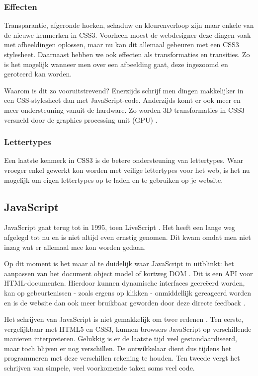 \subsubsection{Effecten}
Transparantie, afgeronde hoeken, schaduw en kleurenverloop zijn maar enkele van de nieuwe kenmerken in CSS3. Voorheen moest de webdesigner deze dingen vaak met afbeeldingen oplossen, maar nu kan dit allemaal gebeuren met een CSS3 stylesheet. Daarnaast hebben we ook effecten als transformaties en transities. Zo is het mogelijk wanneer men over een afbeelding gaat, deze ingezoomd en geroteerd kan worden. 

Waarom is dit zo vooruitstrevend? Enerzijds schrijf men dingen makkelijker in een CSS-stylesheet dan met JavaScript-code. Anderzijds komt er ook meer en meer ondersteuning vanuit de hardware. Zo worden 3D transformaties in CSS3 versneld door de graphics processing unit (GPU) \cite{Hales2012}.

\subsubsection{Lettertypes}
Een laatste kenmerk in CSS3 is de betere ondersteuning van lettertypes. Waar vroeger enkel gewerkt kon worden met veilige lettertypes voor het web, is het nu mogelijk om eigen lettertypes op te laden en te gebruiken op je website.

\subsection{JavaScript}
\label{ref:javascript}
JavaScript gaat terug tot in 1995, toen LiveScript \cite{McFarland2011}. Het heeft een lange weg afgelegd tot nu en is niet altijd even ernstig genomen. Dit kwam omdat men niet inzag wat er allemaal mee kon worden gedaan. 

Op dit moment is het maar al te duidelijk waar JavaScript in uitblinkt: het aanpassen van het document object model of kortweg DOM \cite{PhilDutson2012}. Dit is een API voor HTML-documenten. Hierdoor kunnen dynamische interfaces gecreëerd worden, kan op gebeurtenissen - zoals ergens op klikken - onmiddellijk gereageerd worden en is de website dan ook meer bruikbaar geworden door deze directe feedback \cite{McFarland2011}.

Het schrijven van JavaScript is niet gemakkelijk om twee redenen \cite{McFarland2011}. Ten eerste, vergelijkbaar met HTML5 en CSS3, kunnen browsers JavaScript op verschillende manieren interpreteren. Gelukkig is er de laatste tijd veel gestandaardiseerd, maar toch blijven er nog verschillen. De ontwikkelaar dient dus tijdens het programmeren met deze verschillen rekening te houden. Ten tweede vergt het schrijven van simpele, veel voorkomende taken soms veel code.


